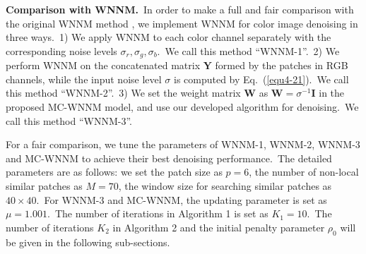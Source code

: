 \textbf{Comparison with WNNM.}\
In order to make a full and fair comparison with the original WNNM method \cite{wnnmijcv}, we implement WNNM for color image denoising in three ways.\ 
1) We apply WNNM to each color channel separately with the corresponding noise levels $\sigma_{r}, \sigma_{g}, \sigma_{b}$.\ We call this method ``WNNM-1''.\
2) We perform WNNM on the concatenated matrix $\mathbf{Y}$ formed by the patches in RGB channels, while the input noise level $\sigma$ is computed by Eq.\ (\ref{equ4-21}).\ We call this method ``WNNM-2''.\
3) We set the weight matrix $\mathbf{W}$ as $\mathbf{W}=\sigma^{-1}\mathbf{I}$ in the proposed MC-WNNM model, and use our developed algorithm for denoising.\ We call this method ``WNNM-3''.

For a fair comparison, we tune the parameters of WNNM-1, WNNM-2, WNNM-3 and MC-WNNM to achieve their best denoising performance.\ The detailed parameters are as follows: we set the patch size as $p = 6$, the number of non-local similar patches as $M = 70$, the window size for searching similar patches as $40\times40$.\ For WNNM-3 and MC-WNNM, the updating parameter is set as $\mu=1.001$.\ The number of iterations in Algorithm 1 is set as $K_{1} = 10$.\ The number of iterations $K_{2}$ in Algorithm 2 and the initial penalty parameter $\rho_{0}$ will be given in the following sub-sections.


